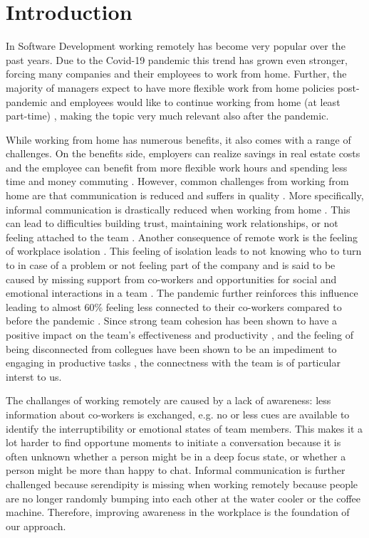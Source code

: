 \chapter{Introduction}
In Software Development working remotely has become very popular over the past years. Due to the  Covid-19 pandemic this trend has grown even stronger, forcing many companies and their employees to work from home.
Further, the majority of managers expect to have more flexible work from home policies post-pandemic and employees would like to continue working from home (at least part-time) \autocite{msworkindexconnection}, making the topic very much relevant also after the pandemic.

While working from home has numerous benefits, it also comes with a range of challenges. On the benefits side, employers can realize savings in real estate costs and the employee can benefit from more flexible work hours and spending less time and money commuting \autocite{mulki2009set}. However, common challenges from working from home are that communication is reduced \autocite{kraut1988patterns} and suffers in quality \autocite{mulki2009set}. More specifically, informal communication is drastically reduced when working from home \autocite{hinds2005understanding}. This can lead to difficulties building trust, maintaining work relationships, or not feeling attached to the team \autocite{comella2020revisiting, olson2006bridging}. Another consequence of remote work is the feeling of workplace isolation \autocite{mulki2009set, marshall2007workplace}. This feeling of isolation leads to not knowing who to turn to in case of a problem or not feeling part of the company and is said to be caused by missing support from co-workers and opportunities for social and emotional interactions in a team \autocite{marshall2007workplace}. The pandemic further reinforces this influence leading to almost 60\% feeling less connected to their co-workers compared to before the pandemic \autocite{msworkindexconnection}. Since strong team cohesion has been shown to have a positive impact on the team's effectiveness and productivity \autocite{carlson2017virtual}, and the feeling of being disconnected from collegues have been shown to be an impediment to engaging in productive tasks \autocite{lostFocus2020}, the connectness with the team is of particular interst to us.

The challanges of working remotely are caused by a lack of awareness: less information about co-workers is exchanged, e.g. no or less cues are available to identify the interruptibility or emotional states of team members. This makes it a lot harder to find opportune moments to initiate a conversation because it is often unknown whether a person might be in a deep focus state, or whether a person might be more than happy to chat. Informal communication is further challenged because serendipity is missing when working remotely because people are no longer randomly bumping into each other at the water cooler or the coffee machine. Therefore, improving awareness in the workplace is the foundation of our approach.

